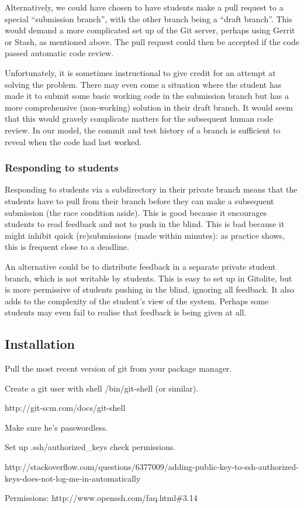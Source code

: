 Alternatively, we could have chosen to have students make a pull request to a
special ``submission branch'', with the other branch being a ``draft branch''.
This would demand a more complicated set up of the Git server, perhaps using
Gerrit or Stash, as mentioned above. The pull request could then be accepted
if the code passed automatic code review.

Unfortunately, it is sometimes instructional to give credit for an attempt at
solving the problem. There may even come a situation where the student has made
it to submit some basic working code in the submission branch but has a more
comprehensive (non-working) solution in their draft branch. It would seem that
this would gravely complicate matters for the subsequent human code review. In
our model, the commit and test history of a branch is sufficient to reveal when
the code had last worked.

\subsubsection{Responding to students}

Responding to students via a subdirectory in their private branch means that
the students have to pull from their branch before they can make a subsequent
submission (the race condition aside). This is good because it encourages
students to read feedback and not to push in the blind. This is bad because it
might inhibit quick (re)submissions (made within minutes): as practice shows,
this is frequent close to a deadline.

An alternative could be to distribute feedback in a separate private student
branch, which is not writable by students. This is easy to set up in Gitolite,
but is more permissive of students pushing in the blind, ignoring all feedback.
It also adds to the complexity of the student's view of the system. Perhaps
some students may even fail to realise that feedback is being given at all.

\subsection{Installation}

Pull the most recent version of git from your package manager.

Create a git user with shell /bin/git-shell (or similar).

http://git-scm.com/docs/git-shell

Make sure he's passwordless.

Set up .ssh/authorized\_keys check permissions.

http://stackoverflow.com/questions/6377009/adding-public-key-to-ssh-authorized-keys-does-not-log-me-in-automatically

Permissions: http://www.openssh.com/faq.html\#3.14


